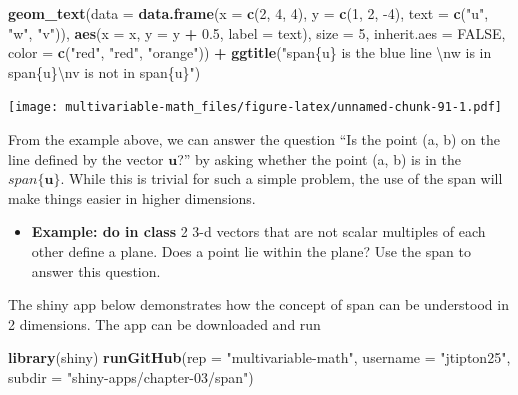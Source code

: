 \documentclass[
]{book}
\newenvironment{Shaded}{\begin{snugshade}}{\end{snugshade}}
\newcommand{\CharTok}[1]{\textcolor[rgb]{0.31,0.60,0.02}{#1}}
\newcommand{\DataTypeTok}[1]{\textcolor[rgb]{0.13,0.29,0.53}{#1}}
\newcommand{\DecValTok}[1]{\textcolor[rgb]{0.00,0.00,0.81}{#1}}
\newcommand{\FloatTok}[1]{\textcolor[rgb]{0.00,0.00,0.81}{#1}}
\newcommand{\KeywordTok}[1]{\textcolor[rgb]{0.13,0.29,0.53}{\textbf{#1}}}
\newcommand{\NormalTok}[1]{#1}
\newcommand{\OperatorTok}[1]{\textcolor[rgb]{0.81,0.36,0.00}{\textbf{#1}}}
\newcommand{\OtherTok}[1]{\textcolor[rgb]{0.56,0.35,0.01}{#1}}
\newcommand{\StringTok}[1]{\textcolor[rgb]{0.31,0.60,0.02}{#1}}
\providecommand{\tightlist}{%
  \setlength{\itemsep}{0pt}\setlength{\parskip}{0pt}}
\theoremstyle{definition}
\theoremstyle{definition}
\theoremstyle{definition}
\theoremstyle{remark}
\begin{document}
\begin{Shaded}
\begin{Highlighting}[]
\StringTok{    }\KeywordTok{geom_text}\NormalTok{(}\DataTypeTok{data =} \KeywordTok{data.frame}\NormalTok{(}\DataTypeTok{x =} \KeywordTok{c}\NormalTok{(}\DecValTok{2}\NormalTok{, }\DecValTok{4}\NormalTok{, }\DecValTok{4}\NormalTok{),  }\DataTypeTok{y =} \KeywordTok{c}\NormalTok{(}\DecValTok{1}\NormalTok{, }\DecValTok{2}\NormalTok{, }\DecValTok{-4}\NormalTok{), }\DataTypeTok{text =} \KeywordTok{c}\NormalTok{(}\StringTok{"u"}\NormalTok{, }\StringTok{"w"}\NormalTok{, }\StringTok{"v"}\NormalTok{)),}
              \KeywordTok{aes}\NormalTok{(}\DataTypeTok{x =}\NormalTok{ x, }\DataTypeTok{y =}\NormalTok{ y }\OperatorTok{+}\StringTok{ }\FloatTok{0.5}\NormalTok{, }\DataTypeTok{label =}\NormalTok{ text), }\DataTypeTok{size =} \DecValTok{5}\NormalTok{, }\DataTypeTok{inherit.aes =} \OtherTok{FALSE}\NormalTok{,}
              \DataTypeTok{color =} \KeywordTok{c}\NormalTok{(}\StringTok{"red"}\NormalTok{, }\StringTok{"red"}\NormalTok{, }\StringTok{"orange"}\NormalTok{)) }\OperatorTok{+}
\StringTok{    }\KeywordTok{ggtitle}\NormalTok{(}\StringTok{"span\{u\} is the blue line }\CharTok{\textbackslash{}n}\StringTok{w is in span\{u\}}\CharTok{\textbackslash{}n}\StringTok{v is not in span\{u\}"}\NormalTok{)}
\end{Highlighting}
\end{Shaded}

\texttt{[image: multivariable-math\_files/figure-latex/unnamed-chunk-91-1.pdf]}

From the example above, we can answer the question ``Is the point (a, b) on the line defined by the vector \(\mathbf{u}\)?'' by asking whether the point (a, b) is in the \(span\{\mathbf{u}\}\). While this is trivial for such a simple problem, the use of the span will make things easier in higher dimensions.

\begin{itemize}
\tightlist
\item
  \textbf{Example: do in class} 2 3-d vectors that are not scalar multiples of each other define a plane. Does a point lie within the plane? Use the span to answer this question.
\end{itemize}

The shiny app below demonstrates how the concept of span can be understood in 2 dimensions. The app can be downloaded and run

\begin{Shaded}
\begin{Highlighting}[]
\KeywordTok{library}\NormalTok{(shiny)}
\KeywordTok{runGitHub}\NormalTok{(}\DataTypeTok{rep =} \StringTok{"multivariable-math"}\NormalTok{, }\DataTypeTok{username =} \StringTok{"jtipton25"}\NormalTok{, }\DataTypeTok{subdir =} \StringTok{"shiny-apps/chapter-03/span"}\NormalTok{) }
\end{Highlighting}
\end{Shaded}
\end{document}
